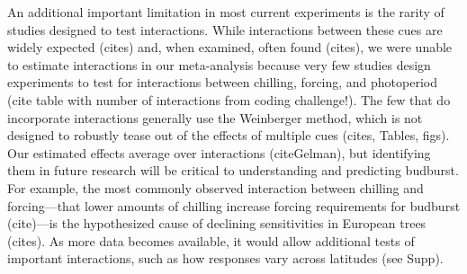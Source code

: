 \documentclass{article}
\begin{document}

\par An additional important limitation in most current experiments is the rarity of studies designed to test interactions. While interactions between these cues are widely expected (cites) and, when examined, often found (cites), we were unable to estimate interactions in our meta-analysis because very few studies design experiments to test for interactions between chilling, forcing, and photoperiod (cite table with number of interactions from coding challenge!). The few that do incorporate interactions generally use the Weinberger method, which is not designed to robustly tease out of the effects of multiple cues (cites, Tables, figs).  Our estimated effects average over interactions (citeGelman), but identifying them in future research will be critical to understanding and predicting budburst. For example, the most commonly observed interaction between chilling and forcing---that lower amounts of chilling increase forcing requirements for budburst (cite)---is the hypothesized cause of declining sensitivities in European trees (cites). As more data becomes available, it would allow additional tests of important interactions, such as how responses vary across latitudes (see Supp). %
\end{document}
